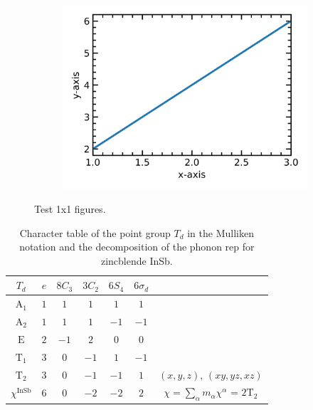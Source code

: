\documentclass[12pt,a4paper,twoside]{article}
\numberwithin{equation}{section}
\renewcommand{\_}{\textscale{.7}{\textunderscore}}
\begin{document}
\begin{figure}[H]
	\centering
	\begin{subfigure}{0.60\linewidth}
		\includegraphics[width=1.0\linewidth]{1x1.png}
	\end{subfigure}
    \caption{Test 1x1 figures.}
\end{figure} 

\begin{table}[H]
  \begin{center}
   \caption{Character table of the point group $T_d$ in the Mulliken notation and the decomposition of the phonon rep for zincblende InSb.}\label{table:Td_character-main-text}
    \begin{tabular}{ | c | c  c  c  c  c | c  |}
      \hline
      $T_d$ & $e$ & $8C_3$ & $3C_2$ & $6S_4$ & $6\sigma_d$ &      \\ \hline

      $\textrm{A}_1$ & $1$ & $1$ & $1$ & $1$ & $1$ &  \\ 
      
      $\textrm{A}_2$ & $1$ & $1$ & $1$ & $-1$ & $-1$ & \\
      
      $\textrm{E}$ & $2$ & $-1$ & $2$ & $0$ & $0$ &  \\
      
      $\textrm{T}_1$ & $3$ & $0$ & $-1$ & $1$ & $-1$  &\\
      
      $\textrm{T}_2$ & $3$ & $0$ & $-1$ & $-1$ & $1$ & $(x,y,z)$, $(xy,yz,xz)$ \\ \hline
      
      $\chi^{\textrm{InSb}}$ & $6$ & $0$ & $-2$ & $-2$ & $2$ & $\chi = \sum_{\alpha} m_{\alpha} \chi^{\alpha}$ =   $2\textrm{T}_2$ \\ \hline
    \end{tabular}
  \end{center}
\end{table}
\end{document}
